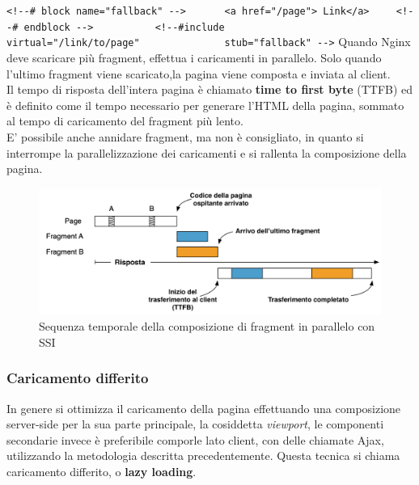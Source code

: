 \verb|<!--# block name="fallback" -->|\linebreak
\verb|      <a href="/page"> Link</a>|\linebreak
\verb|    <!--# endblock -->|\linebreak
\verb|          <!--#include|\linebreak
\verb|              virtual="/link/to/page"|\linebreak
\verb|              stub="fallback" -->|\linebreak
Quando Nginx deve scaricare più fragment, effettua i caricamenti in parallelo.
Solo quando l'ultimo fragment viene scaricato,la pagina viene composta e inviata al client.
\\
Il tempo di risposta dell'intera pagina è chiamato \textbf{time to first byte} (TTFB) ed è definito 
come il tempo necessario per generare l’HTML della pagina, sommato al tempo di caricamento del fragment più lento.
\\E' possibile anche annidare fragment, ma non è consigliato, in quanto si 
interrompe la parallelizzazione dei caricamenti e si rallenta la composizione della pagina.
\begin{figure}[H]
    \centering
    \includegraphics[width=140mm]{img/ssi parallelo}
    \caption{Sequenza temporale della composizione di fragment in parallelo con SSI}
  \end{figure}

\subsubsection{Caricamento differito}
In genere si ottimizza il caricamento della pagina effettuando una composizione server-side per la sua parte principale,
 la cosiddetta \emph{viewport}, le componenti secondarie invece è preferibile comporle lato client, con 
delle chiamate Ajax, utilizzando la metodologia descritta precedentemente. Questa tecnica si chiama caricamento differito, o \textbf{lazy loading}.
\\\\
